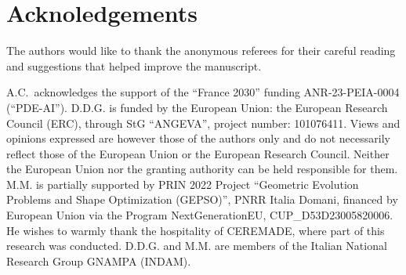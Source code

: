 \documentclass[10pt]{amsart}
\theoremstyle{plain}
\theoremstyle{definition}
\numberwithin{equation}{section}
\begin{document}
\section*{Acknoledgements}
	The authors would like to thank the anonymous referees for their careful reading and suggestions that helped improve the manuscript.

A.C.~acknowledges the support  of the ``France 2030'' funding ANR-23-PEIA-0004 (``PDE-AI''). D.D.G. is funded by the European Union: the European Research Council (ERC), through StG ``ANGEVA'', project number: 101076411. Views and opinions expressed are however those of the authors only and do not necessarily reflect those of the European Union or the European Research Council. Neither the European Union nor the granting authority can be held responsible for them. M.M. is partially supported by PRIN 2022 Project ``Geometric Evolution Problems and Shape Optimization (GEPSO)'', PNRR Italia Domani, financed by European Union via the Program NextGenerationEU, CUP\_D53D23005820006. He wishes to warmly thank the hospitality of CEREMADE, where part of this research was conducted. D.D.G. and M.M. are  members of the Italian National Research Group GNAMPA (INDAM). 
 

 
 \printbibliography
\end{document}
